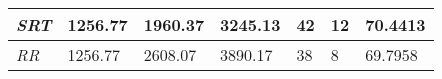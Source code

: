 \documentclass{article}
\begin{document}
\begin{table}[]
\begin{tabular}{|l|l|l|l|l|l|l|}
  \textit{SRT}       & 1256.77                                                                          & 1960.37                                                                     & 3245.13                                                                            & 42                                                                                    & 12                                                                                  & 70.4413                                                                    \\ \hline
  \textit{RR}        & 1256.77                                                                          & 2608.07                                                                     & 3890.17                                                                            & 38                                                                                    & 8                                                                                   & 69.7958                                                                    \\ \hline
  \end{tabular}
  \label{table:11}
\end{table}
\end{document}

